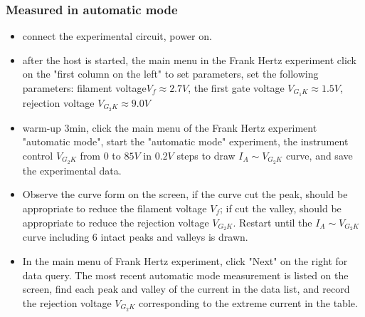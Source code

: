 \documentclass[UTF8]{article}
\begin{document}
	\subsubsection{Measured in automatic mode}
	\begin{itemize}
	\item connect the experimental circuit, power on.
	\item after the host is started, the main menu in the Frank Hertz experiment click on the "first column on the left" to set parameters, set the following parameters: filament voltage$V_f\approx 2.7V$, the first gate voltage $V_{G_1K}\approx 1.5V$, rejection voltage $V_{G_2K}\approx 9.0V$
	\item warm-up 3min, click the main menu of the Frank Hertz experiment "automatic mode", start the "automatic mode" experiment, the instrument control $V_{G_2K}$ from $0$ to $85V$ in $0.2V$ steps to draw $I_A\sim V_{G_2K}$ curve, and save the experimental data.
	\item Observe the curve form on the screen, if the curve cut the peak, should be appropriate to reduce the filament voltage $V_f$; if cut the valley, should be appropriate to reduce the rejection voltage $V_{G_2K}$. Restart until the $I_A\sim V_{G_2K}$curve including 6 intact peaks and valleys is drawn.
	\item In the main menu of Frank Hertz experiment, click "Next" on the right for data query. The most recent automatic mode measurement is listed on the screen, find each peak and valley of the current in the data list, and record the rejection voltage $V_{G_2K}$ corresponding to the extreme current in the table.
	\end{itemize}
\end{document}
